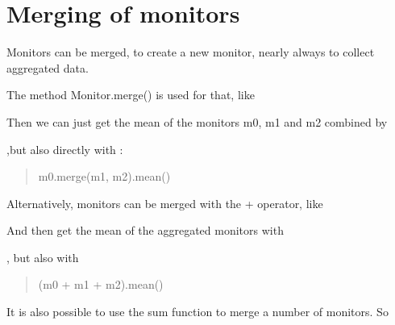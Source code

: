 \documentclass[letterpaper,10pt,english]{sphinxmanual}
\begin{document}
\section{Merging of monitors}
\label{\detokenize{Monitor:merging-of-monitors}}
Monitors can be merged, to create a new monitor, nearly always to collect aggregated data.

The method Monitor.merge() is used for that, like

%
\begin{sphinxVerbatim}[commandchars=\\\{\}]
   
\end{sphinxVerbatim}

Then we can just get the mean of the monitors m0, m1 and m2 combined by

%
\begin{sphinxVerbatim}[commandchars=\\\{\}]
\end{sphinxVerbatim}

,but also directly with :
\begin{quote}

m0.merge(m1, m2).mean()
\end{quote}

Alternatively, monitors can be merged with the + operator, like

%
\begin{sphinxVerbatim}[commandchars=\\\{\}]
      
\end{sphinxVerbatim}

And then get the mean of the aggregated monitors with

%
\begin{sphinxVerbatim}[commandchars=\\\{\}]
\end{sphinxVerbatim}

, but also with
\begin{quote}

(m0 + m1 + m2).mean()
\end{quote}

It is also possible to use the sum function to merge a number of monitors. So
\end{document}
